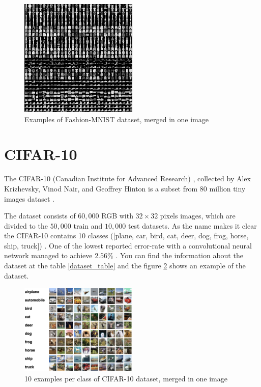 \begin{figure}
  \centering
  \label{fig:fashion_mnist_dataset_example}
  \includegraphics[width=0.5\textwidth]{fig/fashion-mnist-dataset_example}
  \caption{Examples of Fashion-MNIST dataset, merged in one image}
\end{figure}

\section{CIFAR-10}
The CIFAR-10 (Canadian Institute for Advanced Research)
, collected by Alex Krizhevsky, Vinod Nair, and Geoffrey Hinton is a subset from 80 million tiny
images dataset \cite{CIFAR-10_origin_dataset}.

The dataset consists of $60,000$  RGB with $32 \times 32$ pixels images, which are divided to the $50,000$ train and $10,000$ test datasets. As the name makes it clear the CIFAR-10 contains 10 classes ([plane, car, bird, cat, deer, dog, frog, horse, ship, truck]) \cite{CIFAR-10_dataset_reference}.
One of the lowest reported error-rate with a convolutional neural network managed to achieve $2.56\%$ \cite{CIFAR-10_best_result_reference}.  You can
find the information about the dataset at the table
\ref{dataset_table} and the figure \ref{fig:cifar-10_dataset_example} shows an example of the dataset.

\begin{figure}
  \centering
  \label{fig:cifar-10_dataset_example}
  \includegraphics[width=0.5\textwidth]{fig/cifar-10}
  \caption{10 examples per class of CIFAR-10 dataset, merged in one image \cite{CIFAR-10_dataset_reference}}
\end{figure}




